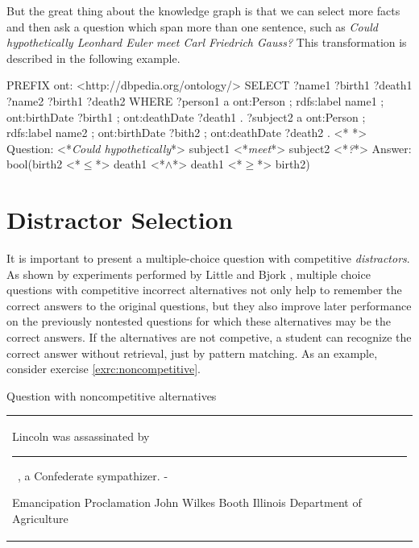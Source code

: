 \documentclass[12pt, twoside]{fithesis2}		%
\renewcommand{\_}{\leavevmode \kern0.07em\vbox{\hrule width0.4em}}
\newcommand{\arrowlinesplit}{%
  \noindent\makebox[\linewidth]{\raisebox{0.15em}{\rule{0.478\textwidth}{0.5pt}}%
  ~$\downarrow$~%
  \noindent\raisebox{0.15em}{\rule{0.478\textwidth}{0.5pt}}}%
}
\newcounter{choice}
\renewcommand\thechoice{\Alph{choice}}
\newcommand\choicelabel{\thechoice.}
\newenvironment{choices}%
  {\vspace{0.8em}\list{\choicelabel}%
     {\usecounter{choice}\def\makelabel##1{\hss\llap{##1}}%
       \settowidth{\leftmargin}{W.\hskip\labelsep\hskip 0.01em}%
       \def\choice{%
         \item
       } %
       \labelwidth\leftmargin\advance\labelwidth-\labelsep
       \topsep=0pt
       \partopsep=0pt
     }%
  }%
  {\vspace{-0.7em}\endlist}
\newenvironment{question}
{
  \begin{center}
  \vspace{-0.5em}
  \begin{tabular}{p{0.9\textwidth}}
}
{
  \\
  \end{tabular}
  \vspace{-1em}
  \end{center}
}
\newcommand{\sentenceGap}{\rule{1.5cm}{0.4pt}~}
\begin{document}
\noindent
But the great thing about the knowledge graph is that we can select more facts and then ask a question which span more than one sentence, such as
\textit{Could hypothetically Leonhard Euler meet Carl Friedrich Gauss?}
This transformation is described in the following example.
\begin{code}
PREFIX ont: <http://dbpedia.org/ontology/>
SELECT ?name1 ?birth1 ?death1 ?name2 ?birth1 ?death2
WHERE {
  ?person1 a ont:Person ;
      rdfs:label name1 ;
      ont:birthDate ?birth1 ;
      ont:deathDate ?death1 .
  ?subject2 a ont:Person ;
      rdfs:label name2 ;
      ont:birthDate ?bith2 ;
      ont:deathDate ?death2 .
}
<*\arrowlinesplit*>
Question: <*\emph{Could hypothetically}*> subject1 <*\emph{meet}*> subject2 <*\emph{?}*>
Answer: bool(birth2 <*$\leq$*> death1 <*$\land$*> death1 <*$\geq$*> birth2)
\end{code}


\section{Distractor Selection}
\label{sec:distractors}

It is important to present a multiple-choice question with competitive \textit{distractors}.
As shown by experiments performed by Little and Bjork \cite{optimizing-multiple-choice}, multiple choice questions with competitive incorrect alternatives not only help to remember the correct answers to the original questions, but they also improve later performance on the previously nontested questions for which these alternatives may be the correct answers. If the alternatives are not competive, a student can recognize the correct answer without retrieval, just by pattern matching.
As an example, consider exercise \ref{exrc:noncompetitive}.
\begin{exercise}
\caption{Question with noncompetitive alternatives}\label{exrc:noncompetitive}
  \begin{question}
  Lincoln was assassinated by \sentenceGap , a Confederate sympathizer.
  \begin{choices}
    \choice Emancipation Proclamation
    \choice John Wilkes Booth
    \choice Illinois
    \choice Department of Agriculture
  \end{choices}
  \end{question}
\end{exercise}
\end{document}
